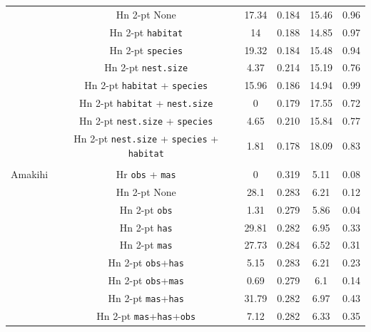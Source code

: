 \documentclass[useAMS,referee,usenatbib]{biom}
\begin{document}
\begin{table}
\begin{tabular}{c c c c c c}
 & Hn 2-pt  None                                                     &  17.34 &  0.184  &  15.46  &  0.96 \\
 & Hn 2-pt \texttt{habitat}                                          &  14     &  0.188  &  14.85  &  0.97 \\
 & Hn 2-pt \texttt{species}                                          &  19.32  &  0.184  &  15.48  &  0.94 \\
 & Hn 2-pt \texttt{nest.size}                                        &  4.37   &  0.214  &  15.19  &  0.76 \\
 & Hn 2-pt \texttt{habitat} + \texttt{species}                       &  15.96  &  0.186  &  14.94  &  0.99 \\
 & Hn 2-pt \texttt{habitat} + \texttt{nest.size}                     &  0      &  0.179  &  17.55  &  0.72 \\
 & Hn 2-pt \texttt{nest.size} + \texttt{species}                     &  4.65   &  0.210  &  15.84  &  0.77 \\
 & Hn 2-pt \texttt{nest.size} + \texttt{species} + \texttt{habitat}  &  1.81   &  0.178  &  18.09  &  0.83 \\
 &&&&&\\
Amakihi  & Hr \texttt{obs} + \texttt{mas} & 0 &  0.319 & 5.11 & 0.08\\ %
 & Hn 2-pt None                                    &  28.1   &  0.283  &  6.21  &  0.12 \\
 & Hn 2-pt \texttt{obs}                            &  1.31   &  0.279  &  5.86  &  0.04 \\
 & Hn 2-pt \texttt{has}                            &  29.81  &  0.282  &  6.95  &  0.33 \\
 & Hn 2-pt \texttt{mas}                            &  27.73  &  0.284  &  6.52  &  0.31 \\
 & Hn 2-pt \texttt{obs}+\texttt{has}               &  5.15   &  0.283  &  6.21  &  0.23 \\
 & Hn 2-pt \texttt{obs}+\texttt{mas}               &  0.69   &  0.279  &  6.1  &  0.14 \\
 & Hn 2-pt \texttt{mas}+\texttt{has}               &  31.79  &  0.282  &  6.97  &  0.43 \\
 & Hn 2-pt \texttt{mas}+\texttt{has}+\texttt{obs}  &  7.12  &  0.282  &  6.33  &  0.35 \\
\hline
\end{tabular}
\label{williams-pike-table}
\end{table}
\end{document}
